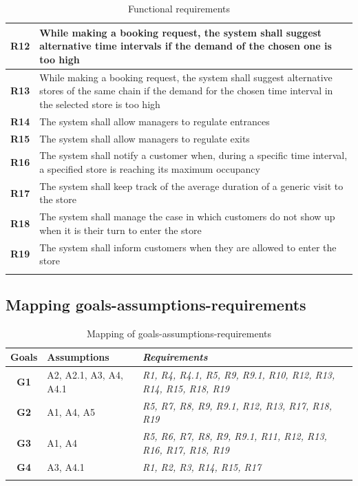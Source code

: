 \documentclass[a4paper,oneside,11pt]{book}   %
\begin{document}
\begin{longtable}[c]{|>{\bfseries{}}c|H{.65\textwidth}|}
        R12  & While making a booking request, the system shall suggest alternative time intervals if the demand of the chosen one is too high \\ \hline
        R13  & While making a booking request, the system shall suggest alternative stores of the same chain if the demand for the chosen time interval in the selected store is too high \\ \hline
        R14  & The system shall allow managers to regulate entrances  \\ \hline
        R15  & The system shall allow managers to regulate exits \\ \hline
        R16  & The system shall notify a customer when, during a specific time interval, a specified store is reaching its maximum occupancy \\ \hline
        R17  & The system shall keep track of the average duration of a generic visit to the store \\ \hline
        R18  & The system shall manage the case in which customers do not show up when it is their turn to enter the store \\ \hline
        R19  & The system shall inform customers when they are allowed to enter the store \\ \hline
        \caption{Functional requirements}
        \label{table:functional_requirements}
    \end{longtable}
    
    \newpage
    \subsection{Mapping goals-assumptions-requirements}
    \begin{longtable}[c] { |>{\bfseries{}}c|P{0.22\textwidth}|>{\em}H{0.40\textwidth}| }
        \hline
        \textbf{Goals} & \textbf{Assumptions} & \emph{\textbf{Requirements}} \\
        \hline
        G1 & A2, A2.1, A3, A4, A4.1 & R1, R4, R4.1, R5, R9, R9.1, R10, R12, R13, R14, R15, R18, R19 \\ \hline
        G2 & A1, A4, A5       & R5, R7, R8, R9, R9.1, R12, R13, R17, R18, R19 \\ \hline
        G3 & A1, A4           & R5, R6, R7, R8, R9, R9.1, R11, R12, R13, R16, R17, R18, R19 \\ \hline
        G4 & A3, A4.1         & R1, R2, R3, R14, R15, R17 \\
        \hline
        \caption{Mapping of goals-assumptions-requirements}
        \label{table:map_goals_assumptions_requirements}
    \end{longtable}
\end{document}
